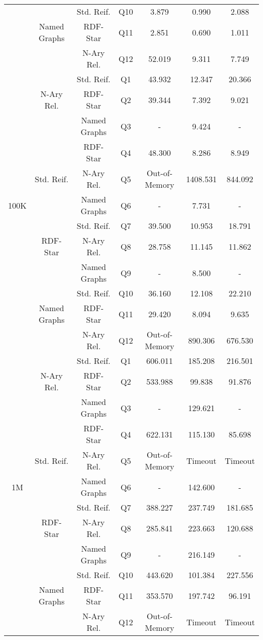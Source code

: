 \begin{table}[]
{\begin{tabular}{c|c|c|c|ccc}
     & & Std. Reif. & Q10 & 3.879 & 0.990 & 2.088 \\
     & Named Graphs  & RDF-Star & Q11 & 2.851 & 0.690 & 1.011 \\
     &  & N-Ary Rel. & Q12 & 52.019 & 9.311 & 7.749 \\ \midrule \midrule
     & & Std. Reif. & Q1 & 43.932 & 12.347 & 20.366 \\
     & N-Ary Rel. & RDF-Star & Q2 & 39.344 & 7.392 & 9.021 \\
     &  & Named Graphs & Q3 & - & 9.424 & - \\ \cmidrule{2-7}
     & & RDF-Star & Q4 & 48.300 & 8.286 & 8.949 \\
     & Std. Reif.  & N-Ary Rel. & Q5 & Out-of-Memory & 1408.531 & 844.092 \\
    100K &  & Named Graphs & Q6 & - & 7.731 & - \\ \cmidrule{2-7}
     & & Std. Reif. & Q7 & 39.500 & 10.953 & 18.791 \\
     & RDF-Star  & N-Ary Rel. & Q8 & 28.758 & 11.145 & 11.862 \\
     &  & Named Graphs & Q9 & - & 8.500 & - \\ \cmidrule{2-7}
     & & Std. Reif. & Q10 & 36.160 & 12.108 & 22.210 \\
     & Named Graphs  & RDF-Star & Q11 & 29.420 & 8.094 & 9.635 \\
     &  & N-Ary Rel. & Q12 & Out-of-Memory & 890.306 & 676.530 \\ \midrule \midrule
     & & Std. Reif. & Q1 & 606.011 & 185.208 & 216.501 \\
     & N-Ary Rel. & RDF-Star & Q2 & 533.988 & 99.838 & 91.876 \\
     & & Named Graphs & Q3 & - & 129.621 & - \\ \cmidrule{2-7}
     & & RDF-Star & Q4 & 622.131 & 115.130 & 85.698 \\
     & Std. Reif.  & N-Ary Rel. & Q5 & Out-of-Memory & Timeout & Timeout \\
    1M &  & Named Graphs & Q6 & - & 142.600 & - \\ \cmidrule{2-7}
     & & Std. Reif. & Q7 & 388.227 & 237.749 & 181.685 \\
     & RDF-Star  & N-Ary Rel. & Q8 & 285.841 & 223.663 & 120.688 \\
     &  & Named Graphs & Q9 & - & 216.149 & - \\ \cmidrule{2-7}
     & & Std. Reif. & Q10 & 443.620 & 101.384 & 227.556 \\
     & Named Graphs  & RDF-Star & Q11 & 353.570 & 197.742 & 96.191 \\
     &  & N-Ary Rel. & Q12 & Out-of-Memory & Timeout & Timeout \\ \bottomrule
    \end{tabular}
    }
\end{table}